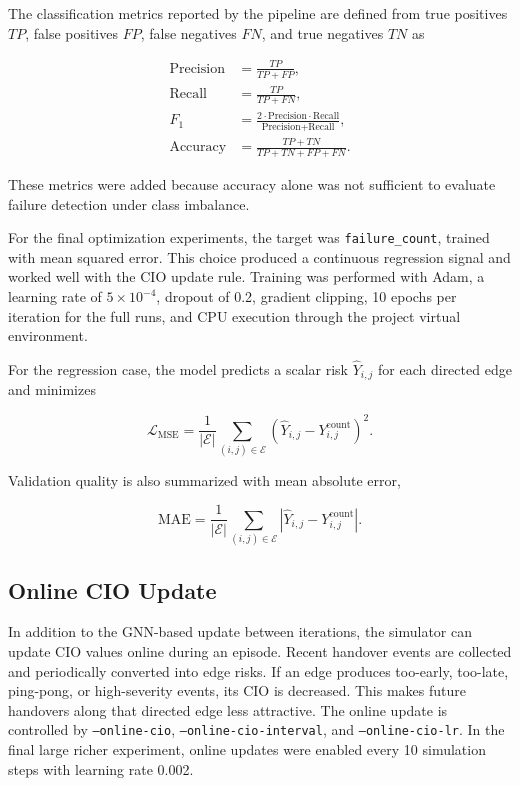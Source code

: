 \documentclass[11pt, a4paper, twoside]{article}
\begin{document}
The classification metrics reported by the pipeline are defined from true positives $TP$, false positives $FP$, false negatives $FN$, and true negatives $TN$ as

\begin{align}
\text{Precision} &= \frac{TP}{TP + FP}, \\
\text{Recall} &= \frac{TP}{TP + FN}, \\
F_1 &= \frac{2 \cdot \text{Precision} \cdot \text{Recall}}{\text{Precision} + \text{Recall}}, \\
\text{Accuracy} &= \frac{TP + TN}{TP + TN + FP + FN}.
\end{align}

These metrics were added because accuracy alone was not sufficient to evaluate failure detection under class imbalance.

For the final optimization experiments, the target was \texttt{failure\_count}, trained with mean squared error. This choice produced a continuous regression signal and worked well with the CIO update rule. Training was performed with Adam, a learning rate of $5 \times 10^{-4}$, dropout of 0.2, gradient clipping, 10 epochs per iteration for the full runs, and CPU execution through the project virtual environment.

For the regression case, the model predicts a scalar risk $\hat{Y}_{i,j}$ for each directed edge and minimizes

\begin{equation}
\mathcal{L}_{\text{MSE}} =
\frac{1}{|\mathcal{E}|}
\sum_{(i,j) \in \mathcal{E}}
\left(\hat{Y}_{i,j} - Y_{i,j}^{\text{count}}\right)^2.
\end{equation}

Validation quality is also summarized with mean absolute error,

\begin{equation}
\text{MAE} =
\frac{1}{|\mathcal{E}|}
\sum_{(i,j) \in \mathcal{E}}
\left|\hat{Y}_{i,j} - Y_{i,j}^{\text{count}}\right|.
\end{equation}

\subsection{Online CIO Update}

In addition to the GNN-based update between iterations, the simulator can update CIO values online during an episode. Recent handover events are collected and periodically converted into edge risks. If an edge produces too-early, too-late, ping-pong, or high-severity events, its CIO is decreased. This makes future handovers along that directed edge less attractive. The online update is controlled by \texttt{--online-cio}, \texttt{--online-cio-interval}, and \texttt{--online-cio-lr}. In the final large richer experiment, online updates were enabled every 10 simulation steps with learning rate 0.002.
\end{document}
